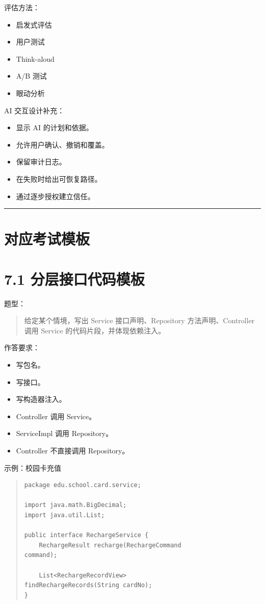 \documentclass[UTF8,zihao=-4]{ctexart}
\begin{document}
评估方法：

\begin{itemize}
\item 启发式评估
\item 用户测试
\item Think-aloud
\item A/B 测试
\item 眼动分析
\end{itemize}

AI 交互设计补充：

\begin{itemize}
\item 显示 AI 的计划和依据。
\item 允许用户确认、撤销和覆盖。
\item 保留审计日志。
\item 在失败时给出可恢复路径。
\item 通过逐步授权建立信任。
\end{itemize}

\bigskip\hrule\bigskip

\section{对应考试模板}

\section{7.1 分层接口代码模板}

题型：

\begin{quote}
给定某个情境，写出 Service 接口声明、Repository 方法声明、Controller 调用 Service 的代码片段，并体现依赖注入。
\end{quote}

作答要求：

\begin{itemize}
\item 写包名。
\item 写接口。
\item 写构造器注入。
\item Controller 调用 Service。
\item ServiceImpl 调用 Repository。
\item Controller 不直接调用 Repository。
\end{itemize}

示例：校园卡充值

\begin{quote}
\footnotesize
\begin{verbatim}
package edu.school.card.service;

import java.math.BigDecimal;
import java.util.List;

public interface RechargeService {
    RechargeResult recharge(RechargeCommand 
command);

    List<RechargeRecordView> 
findRechargeRecords(String cardNo);
}
\end{verbatim}
\end{quote}
\end{document}
